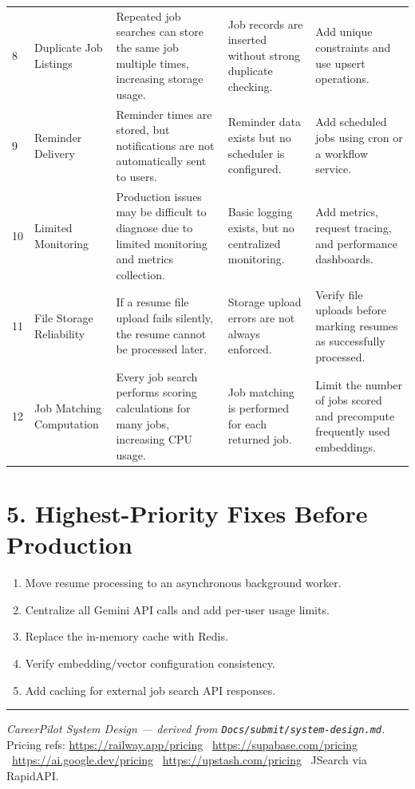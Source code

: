 \documentclass[11pt,a4paper]{article}
\begin{document}
{\begin{longtable}{@{}p{5mm} p{22mm} p{30mm} p{32mm} p{32mm}@{}}
8 &
Duplicate Job Listings &
Repeated job searches can store the same job multiple times, increasing storage usage. &
Job records are inserted without strong duplicate checking. &
Add unique constraints and use upsert operations. \\[2pt]

9 &
Reminder Delivery &
Reminder times are stored, but notifications are not automatically sent to users. &
Reminder data exists but no scheduler is configured. &
Add scheduled jobs using cron or a workflow service. \\[2pt]

10 &
Limited Monitoring &
Production issues may be difficult to diagnose due to limited monitoring and metrics collection. &
Basic logging exists, but no centralized monitoring. &
Add metrics, request tracing, and performance dashboards. \\[2pt]

11 &
File Storage Reliability &
If a resume file upload fails silently, the resume cannot be processed later. &
Storage upload errors are not always enforced. &
Verify file uploads before marking resumes as successfully processed. \\[2pt]

12 &
Job Matching Computation &
Every job search performs scoring calculations for many jobs, increasing CPU usage. &
Job matching is performed for each returned job. &
Limit the number of jobs scored and precompute frequently used embeddings. \\

\bottomrule
\end{longtable}
}

\section*{5. Highest-Priority Fixes Before Production}

\begin{enumerate}[leftmargin=*, itemsep=4pt]
  \item Move resume processing to an asynchronous background worker.
  \item Centralize all Gemini API calls and add per-user usage limits.
  \item Replace the in-memory cache with Redis.
  \item Verify embedding/vector configuration consistency.
  \item Add caching for external job search API responses.
\end{enumerate}

\vspace{1em}
\hrule
\vspace{0.4em}
{\footnotesize
\textit{CareerPilot System Design --- derived from \texttt{Docs/submit/system-design.md}.}\\
Pricing refs: \url{https://railway.app/pricing} \textbullet\
\url{https://supabase.com/pricing} \textbullet\
\url{https://ai.google.dev/pricing} \textbullet\
\url{https://upstash.com/pricing} \textbullet\
JSearch via RapidAPI.
}
\end{document}
